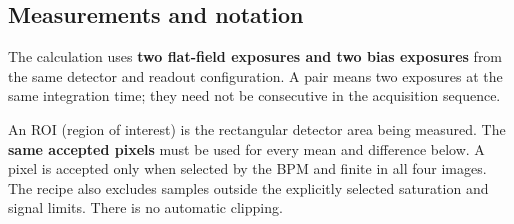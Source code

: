 \documentclass[
  10pt,
  a4paper,
]{article}
\begin{document}
\hypertarget{measurements-and-notation}{%
\subsection{Measurements and notation}\label{measurements-and-notation}}

The calculation uses \textbf{two flat-field exposures and two bias
exposures} from the same detector and readout configuration. A pair
means two exposures at the same integration time; they need not be
consecutive in the acquisition sequence.

An ROI (region of interest) is the rectangular detector area being
measured. The \textbf{same accepted pixels} must be used for every mean
and difference below. A pixel is accepted only when selected by the BPM
and finite in all four images. The recipe also excludes samples outside
the explicitly selected saturation and signal limits. There is no
automatic clipping.
\end{document}
